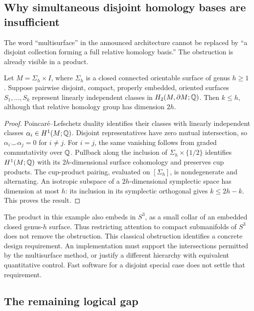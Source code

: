 \subsection{Why simultaneous disjoint homology bases are insufficient}

The word ``multisurface'' in the announced architecture cannot be replaced
by ``a disjoint collection forming a full relative homology basis.''  The
obstruction is already visible in a product.

\begin{proposition}
\label{prop:isotropic-obstruction}
Let $M=\Sigma_h\times I$, where $\Sigma_h$ is a closed connected orientable
surface of genus $h\geq1$.  Suppose pairwise disjoint, compact, properly
embedded, oriented surfaces $S_1,\ldots,S_k$ represent linearly independent classes
in $H_2(M,\partial M;\mathbb Q)$.  Then $k\leq h$, although that relative
homology group has dimension $2h$.
\end{proposition}
\begin{proof}
Poincar\'e--Lefschetz duality identifies their classes with linearly
independent classes $\alpha_i\in H^1(M;\mathbb Q)$.  Disjoint representatives
have zero mutual intersection, so $\alpha_i\smile\alpha_j=0$ for
$i\ne j$.  For $i=j$, the same vanishing follows from graded
commutativity over $\mathbb Q$.  Pullback along the inclusion of
$\Sigma_h\times\{1/2\}$ identifies $H^1(M;\mathbb Q)$ with its
$2h$-dimensional surface cohomology and preserves cup products.
The cup-product pairing, evaluated on $[\Sigma_h]$, is nondegenerate
and alternating.  An isotropic subspace of a $2h$-dimensional symplectic
space has dimension at most $h$: its inclusion in its symplectic
orthogonal gives $k\leq2h-k$.  This proves the result.
\end{proof}

The product in this example also embeds in $S^3$, as a small collar of an
embedded closed genus-$h$ surface.  Thus restricting attention to compact
submanifolds of $S^3$ does not remove the obstruction.
This classical obstruction identifies a concrete design requirement.
An implementation must support the intersections permitted by the
multisurface method, or justify a different hierarchy with equivalent
quantitative control.  Fast software for a disjoint special case does
not settle that requirement.

\subsection{The remaining logical gap}

